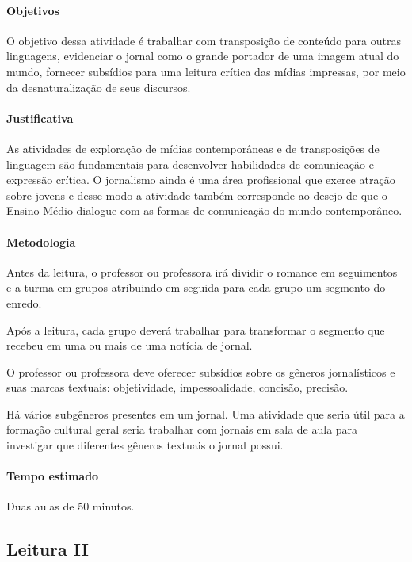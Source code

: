 \documentclass[12pt]{extarticle}
\begin{document}
\paragraph{Objetivos}
O objetivo dessa atividade é trabalhar com transposição de conteúdo para
outras linguagens, evidenciar o jornal como o grande portador de uma
imagem atual do mundo, fornecer subsídios para uma leitura crítica das
mídias impressas, por meio da desnaturalização de seus discursos.

\paragraph{Justificativa}
As atividades de exploração de mídias contemporâneas e de transposições
de linguagem são fundamentais para desenvolver habilidades de
comunicação e expressão crítica. O jornalismo ainda é uma área
profissional que exerce atração sobre jovens e desse modo a atividade
também corresponde ao desejo de que o Ensino Médio dialogue com as
formas de comunicação do mundo contemporâneo.


\paragraph{Metodologia}
Antes da leitura, o professor ou professora irá dividir o romance em
seguimentos e a turma em grupos atribuindo em seguida para cada grupo um
segmento do enredo.

Após a leitura, cada grupo deverá trabalhar para transformar o segmento
que recebeu em uma ou mais de uma notícia de jornal.

O professor ou professora deve oferecer subsídios sobre os gêneros
jornalísticos e suas marcas textuais: objetividade, impessoalidade,
concisão, precisão.

Há vários subgêneros presentes em um jornal. Uma atividade que seria
útil para a formação cultural geral seria trabalhar com jornais em sala
de aula para investigar que diferentes gêneros textuais o jornal possui.

\paragraph{Tempo estimado} Duas aulas de 50 minutos.

\subsection{Leitura II}
\end{document}
